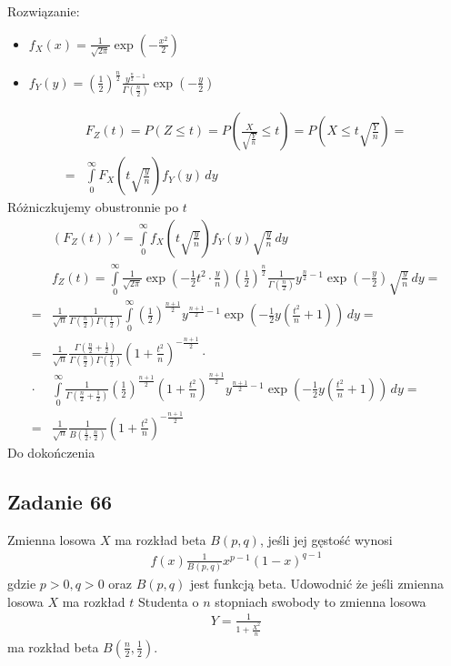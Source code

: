 Rozwiązanie:
\begin{itemize}
\item $ f_X(x)=\frac{1}{\sqrt{2\pi }}\exp \left(-\frac{x^2}{2}\right) $
\item $ f_Y(y)=\left(\frac{1}{2}\right)^\frac{n}{2}\frac{y^{\frac{n}{2}-1}}{\Gamma\left(\frac{n}{2}\right)} \exp\left(-\frac{y}{2}\right)$
\end{itemize}
\begin{align*}
&F_Z(t)=P\left(Z\le t\right)
=
P\left(\frac{X}{\sqrt{\frac{Y}{n}}}\le t\right)
=
P\left(X\le t\sqrt{\frac{Y}{n}}\right)
=\\=&
\int\limits_{0}^{\infty }F_X\left(t\sqrt{\frac{y}{n}}\right)f_Y(y)\,dy
\end{align*}
Różniczkujemy obustronnie po $ t $
\begin{align*}
&\left(F_Z(t)\right)'=
\int\limits_{0}^{\infty }f_X\left(t\sqrt{\frac{y}{n}}\right)f_Y(y)\sqrt{\frac{y}{n}}\,dy\\
&f_Z(t)=\int\limits_{0}^{\infty }\frac{1}{\sqrt{2\pi}}\exp \left(-\frac{1}{2}t^2\cdot
\frac{y}{n}\right)\left(\frac{1}{2}\right)^\frac{n}{2}\frac{1}{\Gamma(\frac{n}{2})}y^{\frac{n}{2}-1}\exp \left(-\frac{y}{2}\right)\sqrt{\frac{y}{n}}\,dy
=\\=&
\frac{1}{\sqrt n}\frac{1}{\Gamma(\frac{n}{2})\Gamma(\frac{1}{2})}\int\limits_{0}^{\infty }\left(\frac{1}{2}\right)^\frac{n+1}{2}y^{\frac{n+1}{2}-1}\exp \left(-\frac{1}{2} y \left(\frac{t^2}{n}+1\right)\right)\,dy
=\\=&
\frac{1}{\sqrt n}\frac{\Gamma(\frac{n}{2}+\frac{1}{2})}{\Gamma(\frac{n}{2})\Gamma(\frac{1}{2})}\left(1+\frac{t^2}{n}\right)^{-\frac{n+1}{2}}
\cdot\\\cdot&
\int\limits_{0}^{\infty }\frac{1}{\Gamma(\frac{n}{2}+\frac{1}{2})}\left(\frac{1}{2}\right)^\frac{n+1}{2}\left(1+\frac{t^2}{n}\right)^{\frac{n+1}{2}}y^{\frac{n+1}{2}-1}\exp \left(-\frac{1}{2} y \left(\frac{t^2}{n}+1\right)\right)\,dy
=\\=&
\frac{1}{\sqrt n}\frac{1}{B(\frac{1}{2},\frac{n}{2})}\left(1+\frac{t^2}{n}\right)^{-\frac{n+1}{2}}
\end{align*}
Do dokończenia


\subsection*{Zadanie 66}
Zmienna losowa $ X $ ma rozkład beta $ B(p,q) $, jeśli jej gęstość wynosi
\begin{gather*}
f(x)\frac{1}{B(p,q)}x^{p-1}(1-x)^{q-1}
\end{gather*}
gdzie $ p>0,q>0 $ oraz $ B(p,q) $ jest funkcją beta. Udowodnić że jeśli zmienna losowa $ X $ ma rozkład $ t $ Studenta o $ n $ stopniach swobody to zmienna losowa
\begin{gather*}
Y=\frac{1}{1+\frac{X^2}{n}}
\end{gather*}
ma rozkład beta $ B\left(\frac{n}{2},\frac{1}{2}\right) $.

